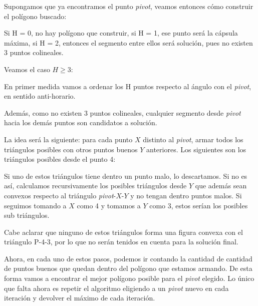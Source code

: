 
Supongamos que ya encontramos el punto \textit{pivot}, veamos entonces cómo construir el polígono buscado:

Si H = 0, no hay polígono que construir, si H = 1, ese punto será la cápsula máxima, si H = 2, entonces el segmento entre ellos será solución, pues no existen 3 puntos colineales.

Veamos el caso $H \geq 3$:

En primer medida vamos a ordenar los H puntos respecto al ángulo con el \textit{pivot}, en sentido anti-horario.


Además, como no existen 3 puntos colineales, cualquier segmento desde \textit{pivot} hacia los demás puntos son candidatos a solución.

La idea será la siguiente: para cada punto $X$ distinto al \textit{pivot}, armar todos los triángulos posibles con otros puntos buenos $Y$ anteriores. Los siguientes son los triángulos posibles desde el punto 4:


Si uno de estos triángulos tiene dentro un punto malo, lo descartamos. Si no es así, calculamos recursivamente los posibles triángulos desde $Y$ que además sean convexos respecto al triángulo \textit{pivot}-$X$-$Y$ y no tengan dentro puntos malos. Si seguimos tomando a $X$ como 4 y tomamos a $Y$ como 3, estos serían los posibles sub triángulos.


Cabe aclarar que ninguno de estos triángulos forma una figura convexa con el triángulo P-4-3, por lo que no serán tenidos en cuenta para la solución final.

Ahora, en cada uno de estos pasos, podemos ir contando la cantidad de cantidad de puntos buenos que quedan dentro del polígono que estamos armando. De esta forma vamos a encontrar el mejor polígono posible para el \textit{pivot} elegido. Lo único que falta ahora es repetir el algoritmo eligiendo a un \textit{pivot} nuevo en cada iteración y devolver el máximo de cada iteración.

